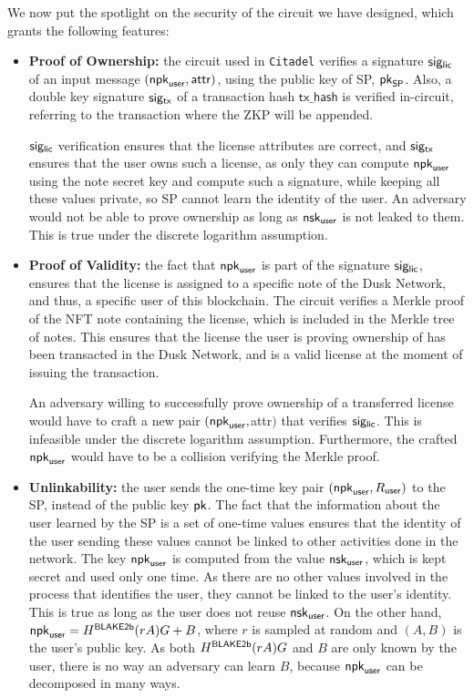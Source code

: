 We now put the spotlight on the security of the circuit we have designed, which grants the following features:

\begin{itemize}
	\item \textbf{Proof of Ownership:} the circuit used in \verb!Citadel! verifies a signature $\mathsf{sig_{lic}}$ of an input message $(\mathsf{npk}_{\mathsf{user}}, \mathsf{attr})$, using the public key of SP, $\mathsf{pk}_{\mathsf{SP}}$. Also, a double key signature $\mathsf{sig_{tx}}$ of a transaction hash $\mathsf{tx\_hash}$ is verified in-circuit, referring to the transaction where the ZKP will be appended.

	$\mathsf{sig_{lic}}$ verification ensures that the license attributes are correct, and $\mathsf{sig_{tx}}$ ensures that the user owns such a license, as only they can compute $\mathsf{npk}_{\mathsf{user}}$ using the note secret key and compute such a signature, while keeping all these values private, so SP cannot learn the identity of the user. An adversary would not be able to prove ownership as long as $\mathsf{nsk}_{\mathsf{user}}$ is not leaked to them. This is true under the discrete logarithm assumption.
 
	\item \textbf{Proof of Validity:} the fact that $\mathsf{npk}_{\mathsf{user}}$ is part of the signature $\mathsf{sig_{lic}}$, ensures that the license is assigned to a specific note of the Dusk Network, and thus, a specific user of this blockchain. The circuit verifies a Merkle proof of the NFT note containing the license, which is included in the Merkle tree of notes. This ensures that the license the user is proving ownership of has been transacted in the Dusk Network, and is a valid license at the moment of issuing the transaction. 

 	An adversary willing to successfully prove ownership of a transferred license would have to craft a new pair $(\mathsf{npk}_{\mathsf{user}}, $attr$)$ that verifies $\mathsf{sig_{lic}}$. This is infeasible under the discrete logarithm assumption. Furthermore, the crafted $\mathsf{npk}_{\mathsf{user}}$ would have to be a collision verifying the Merkle proof.

 \item \textbf{Unlinkability:} the user sends the one-time key pair $(\mathsf{npk}_{\mathsf{user}}, R_{\mathsf{user}})$ to the SP, instead of the public key $\mathsf{pk}$. The fact that the information about the user learned by the SP is a set of one-time values ensures that the identity of the user sending these values cannot be linked to other activities done in the network. The key $\mathsf{npk}_{\mathsf{user}}$ is computed from the value $\mathsf{nsk}_{\mathsf{user}}$, which is kept secret and used only one time. As there are no other values involved in the process that identifies the user, they cannot be linked to the user's identity. This is true as long as the user does not reuse $\mathsf{nsk}_{\mathsf{user}}$. On the other hand, $\mathsf{npk}_{\mathsf{user}} = H^\mathsf{BLAKE2b}(rA)G + B$, where $r$ is sampled at random and $(A, B)$ is the user's public key. As both $H^\mathsf{BLAKE2b}(rA)G$ and $B$ are only known by the user, there is no way an adversary can learn $B$, because $\mathsf{npk}_{\mathsf{user}}$ can be decomposed in many ways.


\end{itemize}

